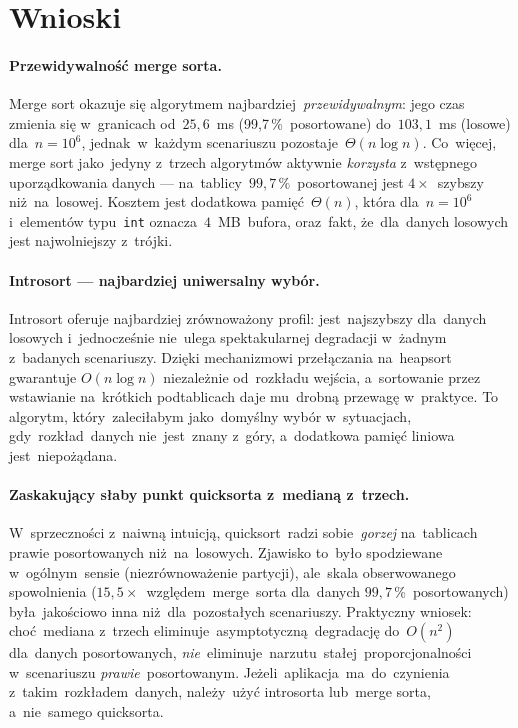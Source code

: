 \documentclass[11pt,a4paper]{article}
\begin{document}
\section{Wnioski}

\paragraph{Przewidywalność merge sorta.}
Merge sort okazuje się algorytmem najbardziej~\emph{przewidywalnym}: jego czas zmienia się w~granicach
od~$25{,}6$~ms (99,7\,\%~posortowane) do~$103{,}1$~ms (losowe) dla~$n=10^6$, jednak~w~każdym scenariuszu
pozostaje~$\Theta(n\log n)$. Co~więcej, merge sort jako~jedyny z~trzech algorytmów aktywnie
\emph{korzysta} z~wstępnego uporządkowania danych --- na~tablicy~$99{,}7\,\%$~posortowanej jest
$4\times$~szybszy niż~na~losowej. Kosztem jest dodatkowa pamięć~$\Theta(n)$, która dla~$n=10^6$ i~elementów
typu~\texttt{int} oznacza~$4$~MB~bufora, oraz~fakt, że~dla~danych losowych jest najwolniejszy z~trójki.

\paragraph{Introsort --- najbardziej uniwersalny wybór.}
Introsort oferuje najbardziej zrównoważony profil: jest~najszybszy dla~danych losowych
i~jednocześnie nie~ulega spektakularnej degradacji w~żadnym z~badanych scenariuszy. Dzięki
mechanizmowi przełączania na~heapsort gwarantuje $O(n\log n)$ niezależnie od~rozkładu wejścia,
a~sortowanie przez wstawianie na~krótkich podtablicach daje mu~drobną przewagę w~praktyce. To
algorytm, który~zaleciłabym jako~domyślny wybór w~sytuacjach, gdy~rozkład~danych nie~jest~znany
z~góry, a~dodatkowa pamięć liniowa jest~niepożądana.

\paragraph{Zaskakujący słaby punkt quicksorta z~medianą z~trzech.}
W~sprzeczności z~naiwną intuicją, quicksort~radzi sobie~\emph{gorzej} na~tablicach prawie
posortowanych niż~na~losowych. Zjawisko to~było spodziewane w~ogólnym~sensie (niezrównoważenie
partycji), ale~skala obserwowanego spowolnienia ($15{,}5\times$~względem~merge~sorta dla~danych
$99{,}7\,\%$~posortowanych) była~jakościowo inna niż~dla~pozostałych scenariuszy. Praktyczny wniosek:
choć~mediana z~trzech eliminuje~asymptotyczną~degradację do~$O(n^2)$ dla~danych posortowanych,
\emph{nie}~eliminuje~narzutu~stałej~proporcjonalności w~scenariuszu \emph{prawie}~posortowanym.
Jeżeli~aplikacja~ma~do~czynienia z~takim~rozkładem~danych, należy~użyć introsorta lub~merge sorta,
a~nie~samego quicksorta.
\end{document}

